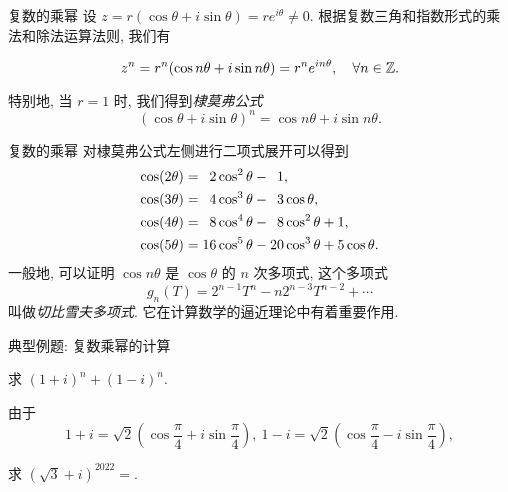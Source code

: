 \begin{frame}{复数的乘幂}
	\onslide<+->
	设 $z=r(\cos\theta+i\sin\theta)=re^{i\theta}\neq0$.
	\onslide<+->
	根据复数三角和指数形式的乘法和除法运算法则, 我们有
	\onslide<+->
	\begin{theorem}[复数的乘幂]
		\[z^n=r^n(\cos{n\theta}+i\sin{n\theta})=r^ne^{in\theta},\quad\forall n\in{\mathbb{Z}}.\]
	\end{theorem}
	\onslide<+->
	特别地, 当 $r=1$ 时, 我们得到\emph{棣莫弗公式}
	\[(\cos\theta+i\sin\theta)^n=\cos{n\theta}+i\sin{n\theta}.\]
\end{frame}


\begin{frame}{复数的乘幂\noexer}
	\onslide<+->
	对棣莫弗公式左侧进行二项式展开可以得到
	\onslide<+->
	\begin{align*}
		\cos(2\theta)&=\hphantom{1}2\cos^2\theta-\hphantom{1}1,\\
		\cos(3\theta)&=\hphantom{1}4\cos^3\theta-\hphantom{1}3\cos\theta,\\
		\cos(4\theta)&=\hphantom{1}8\cos^4\theta-\hphantom{1}8\cos^2\theta+1,\\
		\cos(5\theta)&=16\cos^5\theta-20\cos^3\theta+5\cos\theta.
	\end{align*}
	\onslide<+->
	一般地, 可以证明 $\cos{n\theta}$ 是 $\cos\theta$ 的 $n$ 次多项式,
	\onslide<+->
	这个多项式
	\[g_n(T)=2^{n-1}T^n-n2^{n-3}T^{n-2}+\cdots\]
	叫做\emph{切比雪夫多项式}.
	\onslide<+->
	它在计算数学的逼近理论中有着重要作用.
\end{frame}


\begin{frame}{典型例题: 复数乘幂的计算}
	\onslide<+->
	\begin{example}
		求 $(1+i)^n+(1-i)^n$.
	\end{example}

	\onslide<+->
	\begin{solution}
		由于
		\[1+i=\sqrt2\left(\cos\frac\pi4+i\sin\frac\pi4\right),\ 
		1-i=\sqrt2\left(\cos\frac\pi4-i\sin\frac\pi4\right),\]
		\onslide<+->{%
			因此
			\[
				(1+i)^n+(1-i)^n
				=2^{\frac n2}\left(\cos\frac{n\pi}4+i\sin\frac{n\pi}4+\cos\frac{n\pi}4-i\sin\frac{n\pi}4\right)
				\visible<+->{=2^{\frac n2+1}\cos\frac{n\pi}4.}
			\]
		}\vspace{-\baselineskip}
	\end{solution}

	\onslide<+->
	\begin{exercise}
		求 $(\sqrt3+i)^{2022}=$.
	\end{exercise}
\end{frame}


